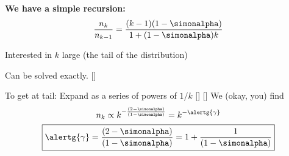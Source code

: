   \textbf{We have a simple recursion:}
    $$  \frac{n_k}{n_{k-1}}
    =
    \frac{(k-1)(1-\simonalpha)}
    {1+(1-\simonalpha)k}
    $$
    
    
     
      Interested in $k$ large (the tail of the distribution)
    
      Can be solved exactly.
    []
    
      To get at tail: Expand as a series of powers of $1/k$
    []
    []
      We (okay, you) find
      $$
      n_k \propto k^{-\frac{(2-\simonalpha)}{(1-\simonalpha)}}  = k^{-\alertg{\gamma}}
      $$
      $$
      \boxed{
        \alertg{\gamma} = \frac{(2-\simonalpha)}{(1-\simonalpha)} = 1 + \frac{1}{(1-\simonalpha)}
      }
      $$
    
  



